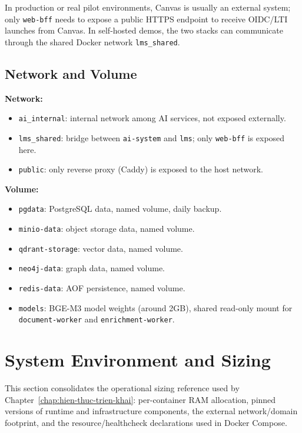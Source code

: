 In production or real pilot environments, Canvas is usually an external
system; only \texttt{web-bff} needs to expose a public HTTPS endpoint to
receive OIDC/LTI launches from Canvas. In self-hosted demos, the two
stacks can communicate through the shared Docker network
\texttt{lms\_shared}.

\subsection{Network and Volume}

\textbf{Network:}
\begin{itemize}
    \item \texttt{ai\_internal}: internal network among AI services, not
          exposed externally.
    \item \texttt{lms\_shared}: bridge between \texttt{ai-system} and
          \texttt{lms}; only \texttt{web-bff} is exposed here.
    \item \texttt{public}: only reverse proxy (Caddy) is exposed to the
          host network.
\end{itemize}

\textbf{Volume:}
\begin{itemize}
    \item \texttt{pgdata}: PostgreSQL data, named volume, daily backup.
    \item \texttt{minio-data}: object storage data, named volume.
    \item \texttt{qdrant-storage}: vector data, named volume.
    \item \texttt{neo4j-data}: graph data, named volume.
    \item \texttt{redis-data}: AOF persistence, named volume.
    \item \texttt{models}: BGE-M3 model weights (around 2GB), shared
          read-only mount for \texttt{document-worker} and
          \texttt{enrichment-worker}.
\end{itemize}

\section{System Environment and Sizing}
\label{appendix:system-environment}

This section consolidates the operational sizing reference used by
Chapter~\ref{chap:hien-thuc-trien-khai}: per-container RAM allocation,
pinned versions of runtime and infrastructure components, the external
network/domain footprint, and the resource/healthcheck declarations used
in Docker Compose.

